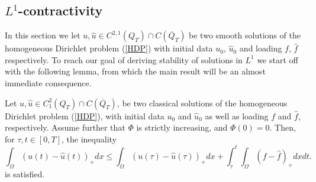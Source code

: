 \documentclass[11pt, a4paper]{article}
\begin{document}
\subsection{$L^1$-contractivity}
In this section we let $u,\hat{u} \in C^{2,1}(Q_T)\cap C(\overline{Q}_T)$ be two smooth solutions of the homogeneous Dirichlet problem (\ref{HDP}) with initial data $u_0$, $\hat{u}_0$ and loading $f$, $\hat{f}$ respectively. To reach our goal of deriving stability of solutions in $L^1$ we start off with the following lemma, from which the main result will be an almost immediate consequence.

\begin{lemma}
\label{lem:l1_stability_classical}
Let $u, \hat{u} \in C^2_1(Q_T)\cap C(\overline{Q}_T)$, be two classical solutions of the homogeneous Dirichlet problem (\ref{HDP}), with initial data $u_0$ and $\hat{u}_0$ as well as loading $f$ and $\hat{f}$, respectively. Assume further that $\Phi$ is strictly increasing, and $\Phi(0)=0$. Then, for $\tau, t \in [0,T]$, the inequality 
\begin{equation}
\label{l1_contr_part1}
\int_{\Omega}(u(t)-\hat{u}(t))_+dx \leq \int_{\Omega}(u(\tau)-\hat{u}(\tau))_+dx + \int_\tau^t\int_{\Omega}(f-\hat{f})_+dxdt.
\end{equation}
is satisfied.
\end{lemma}
\end{document}
